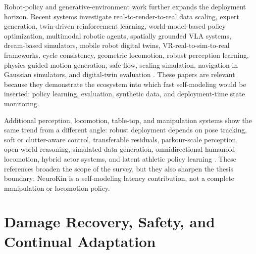 \documentclass[12pt,a4paper,oneside]{report}
\begin{document}
Robot-policy and generative-environment work further expands the deployment horizon. Recent systems investigate real-to-render-to-real data scaling, expert generation, twin-driven reinforcement learning, world-model-based policy optimization, multimodal robotic agents, spatially grounded VLA systems, dream-based simulators, mobile robot digital twins, VR-real-to-sim-to-real frameworks, cycle consistency, geometric locomotion, robust perception learning, physics-guided motion generation, safe flow, scaling simulation, navigation in Gaussian simulators, and digital-twin evaluation \cite{yu2025real2render2real,xu2025expertgen,xu2025twinrl,zhang2026vlambpo,deshpande2025molmobot,tu2025sgvla,he2025vdreamer,mei2026mobrt,zhu2025vrrobo,liu2024cyclerl,liu2025geoloco,zhang2026rpl,bao2026phygile,cho2026safeflow,choi2025scalingsim,liu2025navgsim,mari2024digitaltwin,murugesan2024digitaltwin}. These papers are relevant because they demonstrate the ecosystem into which fast self-modeling would be inserted: policy learning, evaluation, synthetic data, and deployment-time state monitoring.

Additional perception, locomotion, table-top, and manipulation systems show the same trend from a different angle: robust deployment depends on pose tracking, soft or clutter-aware control, transferable residuals, parkour-scale perception, open-world reasoning, simulated data generation, omnidirectional humanoid locomotion, hybrid actor systems, and latent athletic policy learning \cite{wen2024foundationpose,crotti2024softfoot,collins2023ca2t,cho2025rafl,kotecha2026stride,wang2025odyssey,wang2026westworld,wu2026parkour,pan2025learningfly,qureshi2025splatsim,tang2025semantic,zhao2026tabletop,zhao2026robosimgs,jiang2026omnidirectional,li2026haic,zhang2025latent}. These references broaden the scope of the survey, but they also sharpen the thesis boundary: NeuroKin is a self-modeling latency contribution, not a complete manipulation or locomotion policy.

\section{Damage Recovery, Safety, and Continual Adaptation}
\end{document}
